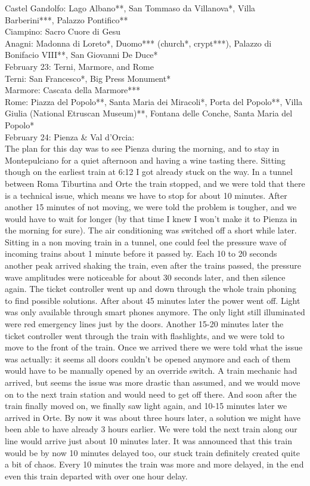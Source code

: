 Castel Gandolfo: Lago Albano**, San Tommaso da Villanova*, Villa Barberini***, Palazzo Pontifico**\\%
Ciampino: Sacro Cuore di Gesu\\%
Anagni: Madonna di Loreto*, Duomo*** (church*, crypt***), Palazzo di Bonifacio VIII**, San Giovanni De Duce*\\%

February 23: Terni, Marmore, and Rome\\%

Terni: San Francesco*, Big Press Monument*\\%
Marmore: Cascata della Marmore***\\%
Rome: Piazza del Popolo**, Santa Maria dei Miracoli*, Porta del Popolo**, Villa Giulia (National Etruscan Museum)**, Fontana delle Conche, Santa Maria del Popolo*\\%

February 24: Pienza \& Val d'Orcia:\\%
The plan for this day was to see Pienza during the morning, and to stay in Montepulciano for a quiet afternoon and having a wine tasting there. Sitting though on the earliest train at 6:12 I got already stuck on the way. In a tunnel between Roma Tiburtina and Orte the train stopped, and we were told that there is a technical issue, which means we have to stop for about 10 minutes. After another 15 minutes of not moving, we were told the problem is tougher, and we would have to wait for longer (by that time I knew I won't make it to Pienza in the morning for sure). The air conditioning was switched off a short while later. Sitting in a non moving train in a tunnel, one could feel the pressure wave of incoming trains about 1 minute before it passed by. Each 10 to 20 seconds another peak arrived shaking the train, even after the trains passed, the pressure wave amplitudes were noticeable for about 30 seconds later, and then silence again. The ticket controller went up and down through the whole train phoning to find possible solutions. After about 45 minutes later the power went off. Light was only available through smart phones anymore. The only light still illuminated were red emergency lines just by the doors. Another 15-20 minutes later the ticket controller went through the train with flashlights, and we were told to move to the front of the train. Once we arrived there we were told what the issue was actually: it seems all doors couldn't be opened anymore and each of them would have to be manually opened by an override switch. A train mechanic had arrived, but seems the issue was more drastic than assumed, and we would move on to the next train station and would need to get off there. And soon after the train finally moved on, we finally saw light again, and 10-15 minutes later we arrived in Orte. By now it was about three hours later, a solution we might have been able to have already 3 hours earlier. We were told the next train along our line would arrive just about 10 minutes later. It was announced that this train would be by now 10 minutes delayed too, our stuck train definitely created quite a bit of chaos. Every 10 minutes the train was more and more delayed, in the end even this train departed with over one hour delay.\\

